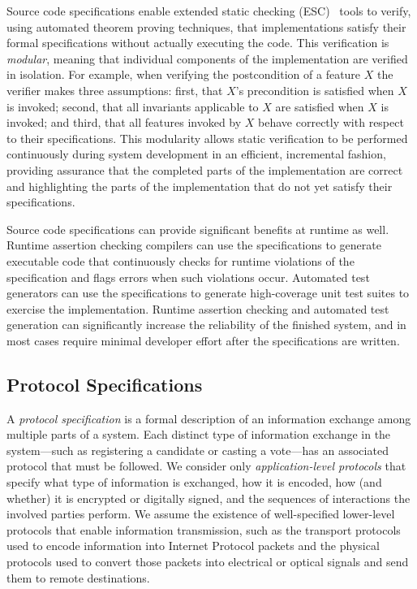 Source code specifications enable extended static checking
(ESC)~\cite{ESC98} tools to verify, using automated theorem proving
techniques, that implementations satisfy their formal specifications
without actually executing the code. This verification is
\emph{modular}, meaning that individual components of the
implementation are verified in isolation. For example, when verifying
the postcondition of a feature $X$ the verifier makes three
assumptions: first, that $X$'s precondition is satisfied when $X$ is
invoked; second, that all invariants applicable to $X$ are satisfied
when $X$ is invoked; and third, that all features invoked by $X$
behave correctly with respect to their specifications. This modularity
allows static verification to be performed continuously during system
development in an efficient, incremental fashion, providing assurance
that the completed parts of the implementation are correct and
highlighting the parts of the implementation that do not yet satisfy
their specifications.

Source code specifications can provide significant benefits at runtime
as well. Runtime assertion checking compilers can use the
specifications to generate executable code that continuously checks
for runtime violations of the specification and flags errors when such
violations occur. Automated test generators can use the specifications
to generate high-coverage unit test suites to exercise the
implementation. Runtime assertion checking and automated test
generation can significantly increase the reliability of the finished
system, and in most cases require minimal developer effort after the
specifications are written.

\subsection{Protocol Specifications}

A \emph{protocol specification} is a formal description of an
information exchange among multiple parts of a system. Each distinct
type of information exchange in the system---such as registering a
candidate or casting a vote---has an associated protocol that must be
followed. We consider only \emph{application-level protocols} that
specify what type of information is exchanged, how it is encoded, how
(and whether) it is encrypted or digitally signed, and the sequences
of interactions the involved parties perform. We assume the existence
of well-specified lower-level protocols that enable information
transmission, such as the transport protocols used to encode
information into Internet Protocol packets and the physical protocols
used to convert those packets into electrical or optical signals and
send them to remote destinations.

